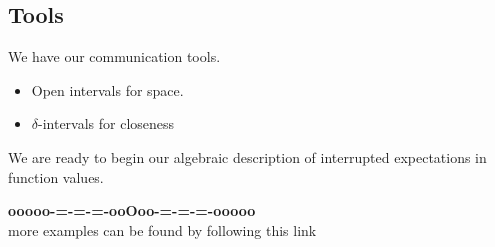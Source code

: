 \documentclass{ximera}
\begin{document}
\subsection*{Tools}


We have our communication tools.

\begin{itemize}
\item Open intervals for space.
\item $\delta$-intervals for closeness
\end{itemize}


We are ready to begin our algebraic description of interrupted expectations in function values. 























\begin{center}
\textbf{\textcolor{green!50!black}{ooooo-=-=-=-ooOoo-=-=-=-ooooo}} \\

more examples can be found by following this link\\ 

\end{center}
\end{document}
